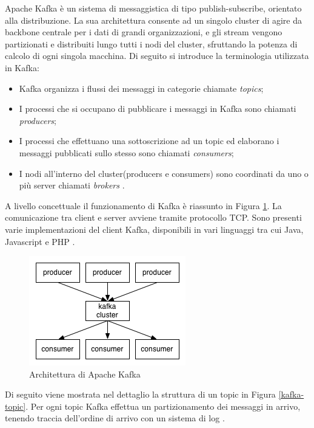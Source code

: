\documentclass[12pt]{article}
\begin{document}
Apache Kafka è un sistema di messaggistica di tipo publish-subscribe, orientato alla distribuzione. La sua architettura consente ad un singolo cluster di agire da backbone centrale per i dati di grandi organizzazioni, e gli stream vengono partizionati e distribuiti lungo tutti i nodi del cluster, sfruttando la potenza di calcolo di ogni singola macchina. Di seguito si introduce la terminologia utilizzata in Kafka: 

\begin{itemize}
	\item Kafka organizza i flussi dei messaggi in categorie chiamate \textit{topics};
	\item I processi che si occupano di pubblicare i messaggi in Kafka sono chiamati \textit{producers};
	\item I processi che effettuano una sottoscrizione ad un topic ed elaborano i messaggi pubblicati sullo stesso sono chiamati \textit{consumers};
	\item I nodi all'interno del cluster(producers e consumers) sono coordinati da uno o più server chiamati \textit{brokers} \cite{kafka}.
	
\end{itemize}

A livello concettuale il funzionamento di Kafka è riassunto in Figura \ref{kafka}. La comunicazione tra client e server avviene tramite protocollo TCP. Sono presenti varie implementazioni del client Kafka, disponibili in vari linguaggi tra cui Java, Javascript e PHP \cite{kafka}. 

\begin{figure}[H]
	\centering
	\includegraphics[scale=0.80]{images/kafka.png}
	\caption{Architettura di Apache Kafka \cite{kafka}}
	\label{kafka}
\end{figure}


Di seguito viene mostrata nel dettaglio la struttura di un topic in Figura \ref{kafka-topic}. Per ogni topic Kafka effettua un partizionamento dei messaggi in arrivo, tenendo traccia dell'ordine di arrivo con un sistema di log \cite{kafka}. 
\end{document}

